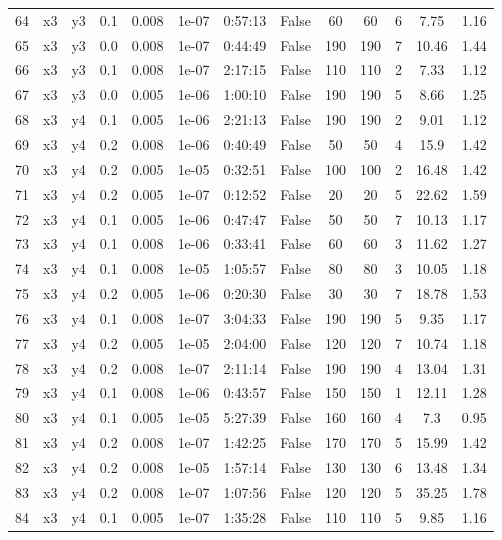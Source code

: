 \begin{longtable}{c | c | c | c | c | c | c | c | c | c | c | c | c}
64 & x3 & y3 & 0.1 & 0.008 & 1e-07 & 0:57:13 & False & 60 & 60 & 6 & 7.75 & 1.16 \\
65 & x3 & y3 & 0.0 & 0.008 & 1e-07 & 0:44:49 & False & 190 & 190 & 7 & 10.46 & 1.44 \\
66 & x3 & y3 & 0.1 & 0.008 & 1e-07 & 2:17:15 & False & 110 & 110 & 2 & 7.33 & 1.12 \\
67 & x3 & y3 & 0.0 & 0.005 & 1e-06 & 1:00:10 & False & 190 & 190 & 5 & 8.66 & 1.25 \\
68 & x3 & y4 & 0.1 & 0.005 & 1e-06 & 2:21:13 & False & 190 & 190 & 2 & 9.01 & 1.12 \\
69 & x3 & y4 & 0.2 & 0.008 & 1e-06 & 0:40:49 & False & 50 & 50 & 4 & 15.9 & 1.42 \\
70 & x3 & y4 & 0.2 & 0.005 & 1e-05 & 0:32:51 & False & 100 & 100 & 2 & 16.48 & 1.42 \\
71 & x3 & y4 & 0.2 & 0.005 & 1e-07 & 0:12:52 & False & 20 & 20 & 5 & 22.62 & 1.59 \\
72 & x3 & y4 & 0.1 & 0.005 & 1e-06 & 0:47:47 & False & 50 & 50 & 7 & 10.13 & 1.17 \\
73 & x3 & y4 & 0.1 & 0.008 & 1e-06 & 0:33:41 & False & 60 & 60 & 3 & 11.62 & 1.27 \\
74 & x3 & y4 & 0.1 & 0.008 & 1e-05 & 1:05:57 & False & 80 & 80 & 3 & 10.05 & 1.18 \\
75 & x3 & y4 & 0.2 & 0.005 & 1e-06 & 0:20:30 & False & 30 & 30 & 7 & 18.78 & 1.53 \\
76 & x3 & y4 & 0.1 & 0.008 & 1e-07 & 3:04:33 & False & 190 & 190 & 5 & 9.35 & 1.17 \\
77 & x3 & y4 & 0.2 & 0.005 & 1e-05 & 2:04:00 & False & 120 & 120 & 7 & 10.74 & 1.18 \\
78 & x3 & y4 & 0.2 & 0.008 & 1e-07 & 2:11:14 & False & 190 & 190 & 4 & 13.04 & 1.31 \\
79 & x3 & y4 & 0.1 & 0.008 & 1e-06 & 0:43:57 & False & 150 & 150 & 1 & 12.11 & 1.28 \\
80 & x3 & y4 & 0.1 & 0.005 & 1e-05 & 5:27:39 & False & 160 & 160 & 4 & 7.3 & 0.95 \\
81 & x3 & y4 & 0.2 & 0.008 & 1e-07 & 1:42:25 & False & 170 & 170 & 5 & 15.99 & 1.42 \\
82 & x3 & y4 & 0.2 & 0.008 & 1e-05 & 1:57:14 & False & 130 & 130 & 6 & 13.48 & 1.34 \\
83 & x3 & y4 & 0.2 & 0.008 & 1e-07 & 1:07:56 & False & 120 & 120 & 5 & 35.25 & 1.78 \\
84 & x3 & y4 & 0.1 & 0.005 & 1e-07 & 1:35:28 & False & 110 & 110 & 5 & 9.85 & 1.16 \\

\end{longtable}
